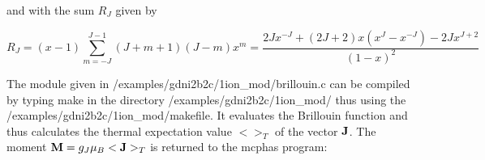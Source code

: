 and with the sum $R_J$ given by

\begin{equation}
R_J=(x-1)\sum_{m=-J}^{J-1}(J+m+1)(J-m)x^m=\frac{2Jx^{-J}+(2J+2)x(x^{J}-x^{-J})-2Jx^{J+2}}{(1-x)^2}
\end{equation}

The module given in {\prg /examples/gdni2b2c/1ion\_mod/brillouin.c} 
can be compiled
by typing make in the directory {\prg /examples/gdni2b2c/1ion\_mod/} thus using the
{\prg  /examples/gdni2b2c/1ion\_mod/makefile}. It 
evaluates the Brillouin function and thus calculates the thermal expectation 
value $<>_T$ of the vector $\mathbf J$. 
The moment ${\mathbf M}=g_J \mu_B <{\mathbf J}>_T$
is returned to the mcphas program:


